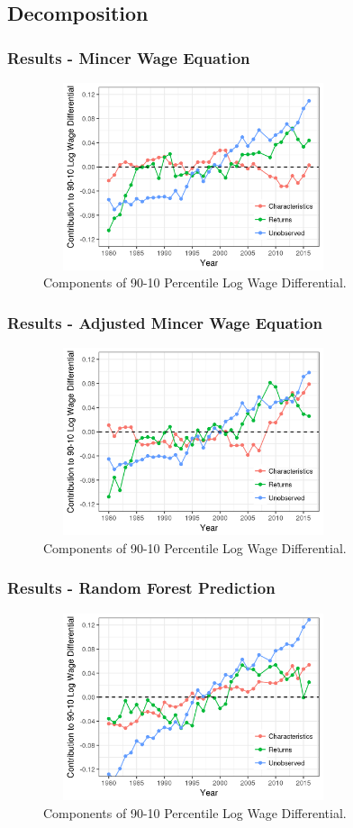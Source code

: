 \documentclass{beamer}
\begin{document}
\subsection{Decomposition}
\begin{frame}
\frametitle{Results - Mincer Wage Equation}
\pause
\begin{figure}
  \centering
  \caption{Components of 90-10 Percentile Log Wage Differential.}
  \includegraphics[width=8.8cm, height=5.5cm]{edit1.png}
\end{figure}
\end{frame}


\begin{frame}
\frametitle{Results - Adjusted Mincer Wage Equation}
\pause
\begin{figure}
  \centering
  \caption{Components of 90-10 Percentile Log Wage Differential.}
  \includegraphics[width=8.8cm, height=5.5cm]{edit2.png}
\end{figure}
\end{frame}


\begin{frame}
\frametitle{Results - Random Forest Prediction}
\pause
\begin{figure}
  \centering
  \caption{Components of 90-10 Percentile Log Wage Differential.}
  \includegraphics[width=8.8cm, height=5.5cm]{edit3.png}
\end{figure}
\end{frame}
\end{document}
